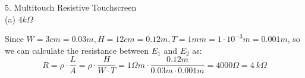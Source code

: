 \documentclass{article}
\begin{document}
{\Large 5. Multitouch Resistive Touchscreen} \\[.5cm]
{\large (a) $4 k\Omega$\\ }

Since $W = 3cm = 0.03m, H = 12cm = 0.12m, T = 1mm = 1\cdot10^{-3}m = 0.001m$, so we can calculate the resistance between $E_1$ and $E_2$ as:
$$R = \rho\cdot\frac{L}{A} = \rho\cdot\frac{H}{W\cdot T} = 1\Omega m\cdot\frac{0.12m}{0.03m\cdot0.001m} = 4000\Omega = 4\ k\Omega$$
\end{document}
